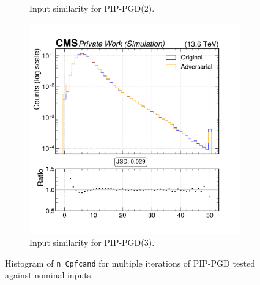 \begin{figure}[htbp]
\begin{subfigure}[t]{0.32\textwidth}
    \caption*{Input similarity for PIP-PGD(2).}
  \end{subfigure}\hfill
  \begin{subfigure}[t]{0.32\textwidth}
    \includegraphics[width=\linewidth]{media/output/features/compare/combined_it_3/cmp_global_features_n_Cpfcand.pdf}
    \caption*{Input similarity for PIP-PGD(3).}
  \end{subfigure}

  \caption*{Histogram of \texttt{n\_Cpfcand} for multiple iterations of PIP-PGD tested against nominal inputs.}
  \label{fig:combined_input_n_Cpfcand}
\end{figure}

